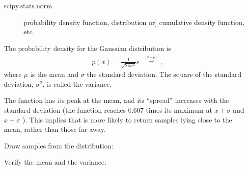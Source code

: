 \documentclass[letterpaper,10pt,english]{sphinxmanual}
\begin{document}
\begin{fulllineitems}
\begin{description}
\end{description}
\begin{description}
\item[{scipy.stats.norm}] \leavevmode{[}probability density function, distribution or{]}
cumulative density function, etc.

\end{description}

The probability density for the Gaussian distribution is
\begin{equation*}
\begin{split}p(x) = \frac{1}{\sqrt{ 2 \pi \sigma^2 }}
e^{ - \frac{ (x - \mu)^2 } {2 \sigma^2} },\end{split}
\end{equation*}
where \(\mu\) is the mean and \(\sigma\) the standard
deviation. The square of the standard deviation, \(\sigma^2\),
is called the variance.

The function has its peak at the mean, and its “spread” increases with
the standard deviation (the function reaches 0.607 times its maximum at
\(x + \sigma\) and \(x - \sigma\) \sphinxfootnotemark[2]).  This implies that
 is more likely to return samples lying close to
the mean, rather than those far away.

Draw samples from the distribution:

\begin{sphinxVerbatim}[commandchars=\\\{\}]
     
    
\end{sphinxVerbatim}

Verify the mean and the variance:

\begin{sphinxVerbatim}[commandchars=\\\{\}]
  
\end{sphinxVerbatim}

\begin{sphinxVerbatim}[commandchars=\\\{\}]
   
\end{sphinxVerbatim}


\end{fulllineitems}
\end{document}
